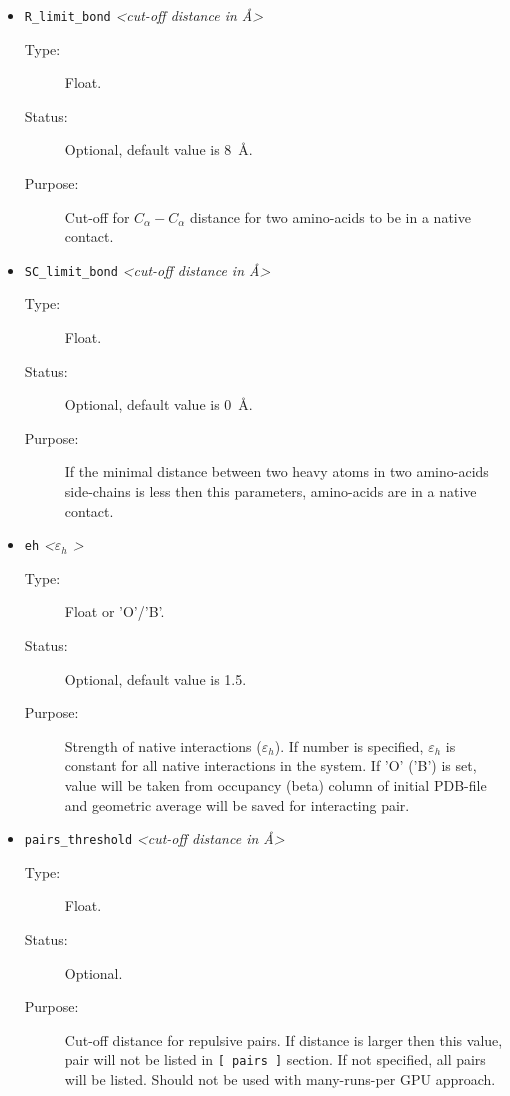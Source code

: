 \documentclass[a4paper]{article}
\begin{document}
\begin{itemize}
\item \texttt{R\_limit\_bond} \textit{\textless cut-off distance in \AA\textgreater}
\begin{description}
\item[Type:] Float.
\item[Status:] Optional, default value is 8~\AA.
\item[Purpose:] Cut-off for $C_{\alpha}-C_{\alpha}$ distance for two amino-acids to be in a native contact.
\end{description}

\item \texttt{SC\_limit\_bond} \textit{\textless cut-off distance in \AA\textgreater}
\begin{description}
\item[Type:] Float.
\item[Status:] Optional, default value is 0~\AA.
\item[Purpose:] If the minimal distance between two heavy atoms in two amino-acids side-chains is less then this parameters, amino-acids are in a native contact.
\end{description}

\item \texttt{eh} \textit{\textless $\varepsilon_h$ \textgreater}
\begin{description}
\item[Type:] Float or 'O'/'B'.
\item[Status:] Optional, default value is 1.5.
\item[Purpose:] Strength of native interactions ($\varepsilon_h$). If number is specified, $\varepsilon_h$ is constant for all native interactions in the system. If 'O' ('B') is set, value will be taken from occupancy (beta) column of initial PDB-file and geometric average will be saved for interacting pair.
\end{description}

\item \texttt{pairs\_threshold} \textit{\textless cut-off distance in \AA\textgreater}
\begin{description}
\item[Type:] Float.
\item[Status:] Optional.
\item[Purpose:] Cut-off distance for repulsive pairs. If distance is larger then this value, pair will not be listed in \texttt{[ pairs ]} section. If not specified, all pairs will be listed. Should not be used with many-runs-per GPU approach.
\end{description}

\end{itemize}
\end{document}

